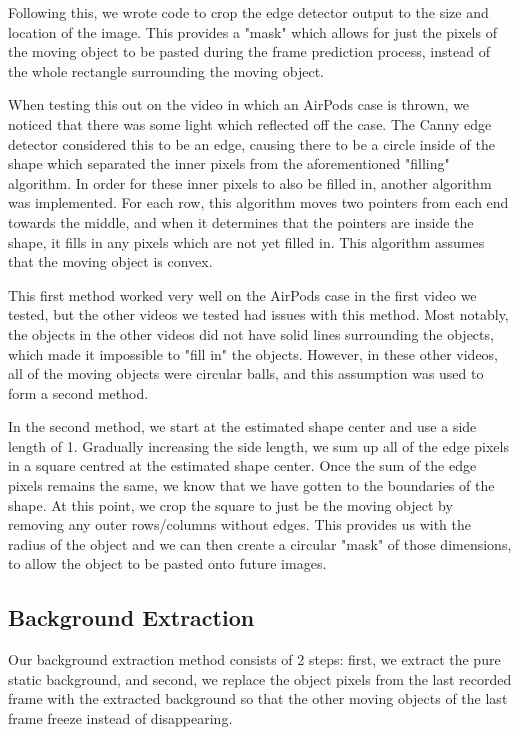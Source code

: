 \documentclass[12pt]{article}
\begin{document}
Following this, we wrote code to crop the edge detector output to the size and location of the image. This provides a "mask" which allows for just the pixels of the moving object to be pasted during the frame prediction process, instead of the whole rectangle surrounding the moving object.

When testing this out on the video in which an AirPods case is thrown, we noticed that there was some light which reflected off the case. The Canny edge detector considered this to be an edge, causing there to be a circle inside of the shape which separated the inner pixels from the aforementioned "filling" algorithm. In order for these inner pixels to also be filled in, another algorithm was implemented. For each row, this algorithm moves two pointers from each end towards the middle, and when it determines that the pointers are inside the shape, it fills in any pixels which are not yet filled in. This algorithm assumes that the moving object is convex.

This first method worked very well on the AirPods case in the first video we tested, but the other videos we tested had issues with this method. Most notably, the objects in the other videos did not have solid lines surrounding the objects, which made it impossible to "fill in" the objects. However, in these other videos, all of the moving objects were circular balls, and this assumption was used to form a second method.

In the second method, we start at the estimated shape center and use a side length of 1. Gradually increasing the side length, we sum up all of the edge pixels in a square centred at the estimated shape center. Once the sum of the edge pixels remains the same, we know that we have gotten to the boundaries of the shape. At this point, we crop the square to just be the moving object by removing any outer rows/columns without edges. This provides us with the radius of the object and we can then create a circular "mask" of those dimensions, to allow the object to be pasted onto future images.


\subsection*{Background Extraction}

Our background extraction method consists of 2 steps: first, we extract the pure static background, and second, we replace the object pixels from the last recorded frame with the extracted background so that the other moving objects of the last frame freeze instead of disappearing.
\end{document}
